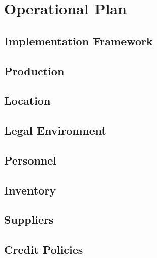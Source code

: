 {\let\cleardoublepage\relax \chapter{Operational Plan}}

\section{Implementation Framework}

\section{Production}

\section{Location}

\section{Legal Environment}

\section{Personnel}

\section{Inventory}

\section{Suppliers}

\section{Credit Policies}